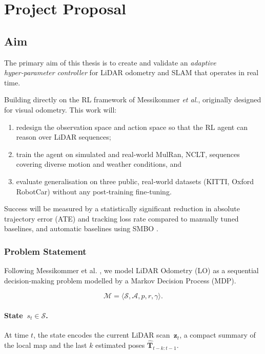 \documentclass[12pt]{article}
\begin{document}
\section{Project Proposal}


\subsection{Aim}
The primary aim of this thesis is to create and validate an \emph{adaptive hyper‑parameter controller} for LiDAR odometry and SLAM that operates in real time. 

Building directly on the RL framework of Messikommer \emph{et al.}, originally designed for visual odometry. This work will:

\begin{enumerate}
  \item redesign the observation space and action space so that the RL agent can reason over LiDAR sequences;
  \item train the agent on simulated and real-world MulRan, NCLT, sequences covering diverse motion and weather conditions, and
  \item evaluate generalisation on three public, real‑world datasets (KITTI, Oxford RobotCar) without any post‑training fine‑tuning.
\end{enumerate}

Success will be measured by a statistically significant reduction in absolute trajectory error (ATE) and tracking loss rate compared to manually tuned baselines, and automatic baselines using SMBO \cite{koide_2021_automatic}.

\subsubsection{Problem Statement}
Following Messikommer et al. \cite{nicomessikommer_2024_reinforcement}, we model LiDAR Odometry (LO) as a sequential decision‑making problem modelled by a Markov Decision Process (MDP).

\[
  \mathcal{M}=\langle \mathcal{S},\mathcal{A},p,r,\gamma\rangle .
\]

\paragraph{State\, $s_t\!\in\!\mathcal{S}$.}
At time $t$, the state encodes the current LiDAR scan~$\mathbf{z}_t$, a compact summary of the local map and the last $k$ estimated poses $\hat{\mathbf{T}}_{t-k:t-1}$.
\end{document}
